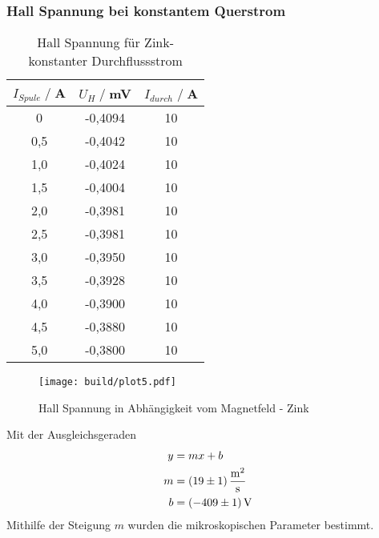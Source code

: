 \subsubsection{Hall Spannung bei konstantem Querstrom}
\begin{table}[H]
    \centering
    \begin{tabular}{c c c}
        \toprule
        $I_{Spule} \;/\;$A & $U_H\;/\;$mV & $I_{durch} \;/\;$A\\
        \midrule
            0                   &-0,4094&             10\\
            0,5                 &-0,4042&             10\\
            1,0                 &-0,4024&             10\\
            1,5                 &-0,4004&             10\\
            2,0                 &-0,3981&             10\\
            2,5                 &-0,3981&             10\\
            3,0                 &-0,3950&             10\\
            3,5                 &-0,3928&             10\\
            4,0                 &-0,3900&             10\\
            4,5                 &-0,3880&             10\\
            5,0                 &-0,3800&             10\\
        \bottomrule
    \end{tabular}
    \caption{Hall Spannung für Zink- konstanter Durchflussstrom}
    \label{tab:Zn_B}
\end{table}
\begin{figure}[H]
    \centering
    \texttt{[image: build/plot5.pdf]}
    \caption{Hall Spannung in Abhängigkeit vom Magnetfeld - Zink}
    \label{fig:Zn_B}
\end{figure}
Mit der Ausgleichsgeraden
\begin{align*}
    y &= mx + b\\
    m &= \SI{19 \pm 1}{\square \meter \per \second} \\
    b &= \SI{-409 \pm 1}{\volt} \\ 
\end{align*}
Mithilfe der Steigung $m$  wurden die mikroskopischen Parameter bestimmt.

